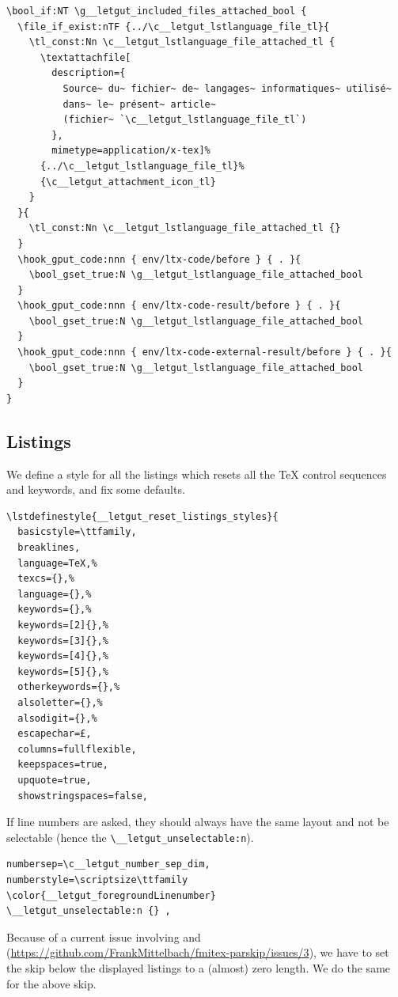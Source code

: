 \documentclass{letgut}
\begin{document}
\begin{lstlisting}
\bool_if:NT \g__letgut_included_files_attached_bool {
  \file_if_exist:nTF {../\c__letgut_lstlanguage_file_tl}{
    \tl_const:Nn \c__letgut_lstlanguage_file_attached_tl {
      \textattachfile[
        description={
          Source~ du~ fichier~ de~ langages~ informatiques~ utilisé~
          dans~ le~ présent~ article~
          (fichier~ `\c__letgut_lstlanguage_file_tl`)
        },
        mimetype=application/x-tex]%
      {../\c__letgut_lstlanguage_file_tl}%
      {\c__letgut_attachment_icon_tl}
    }
  }{
    \tl_const:Nn \c__letgut_lstlanguage_file_attached_tl {}
  }
  \hook_gput_code:nnn { env/ltx-code/before } { . }{
    \bool_gset_true:N \g__letgut_lstlanguage_file_attached_bool
  }
  \hook_gput_code:nnn { env/ltx-code-result/before } { . }{
    \bool_gset_true:N \g__letgut_lstlanguage_file_attached_bool
  }
  \hook_gput_code:nnn { env/ltx-code-external-result/before } { . }{
    \bool_gset_true:N \g__letgut_lstlanguage_file_attached_bool
  }
}
\end{lstlisting}
\subsection{Listings}
\label{ImplementationListings-514h55h0jlj0}
We define a style for all the listings which resets all the \TeX{} control
sequences and keywords, and fix some defaults.

\begin{lstlisting}
\lstdefinestyle{__letgut_reset_listings_styles}{
  basicstyle=\ttfamily,
  breaklines,
  language=TeX,%
  texcs={},%
  language={},%
  keywords={},%
  keywords=[2]{},%
  keywords=[3]{},%
  keywords=[4]{},%
  keywords=[5]{},%
  otherkeywords={},%
  alsoletter={},%
  alsodigit={},%
  escapechar=£,
  columns=fullflexible,
  keepspaces=true,
  upquote=true,
  showstringspaces=false,
\end{lstlisting}

If line numbers are asked, they should always have the same layout and not be
selectable (hence the \lstinline+\__letgut_unselectable:n+).

\begin{lstlisting}
numbersep=\c__letgut_number_sep_dim,
numberstyle=\scriptsize\ttfamily
\color{__letgut_foregroundLinenumber}
\__letgut_unselectable:n {} ,
\end{lstlisting}

Because of a current issue involving  and 
(\url{https://github.com/FrankMittelbach/fmitex-parskip/issues/3}), we have to
set the skip below the displayed listings to a (almost) zero length. We do the
same for the above skip.
\end{document}
